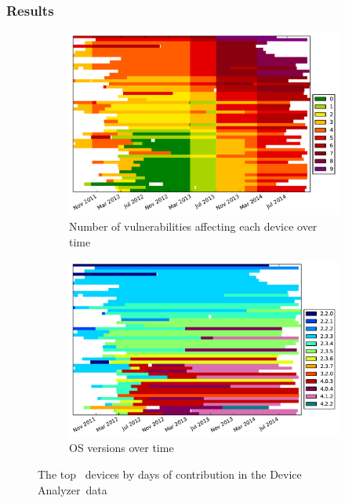 \documentclass[conference,a4paper,twoside]{IEEEtran}
\newcommand{\da}{Device Analyzer}
\begin{document}
\subsubsection{Results}
\begin{figure}
 \centering
 \begin{subfigure}[b]{\columnwidth}
  \includegraphics[width=\columnwidth]{figures/device-data-all-security}
  \caption{Number of vulnerabilities affecting each device over time}
  \label{fig:device_data_security}
 \end{subfigure}
 \begin{subfigure}[b]{\columnwidth}
  \includegraphics[width=\columnwidth]{figures/device-data-all-os}
  \caption{OS versions over time}
  \label{fig:device_data_os}
 \end{subfigure}
 \caption{The top \daNumDeviceDataDevices\ devices by days of contribution in the \da\ data}
\end{figure}
\end{document}
